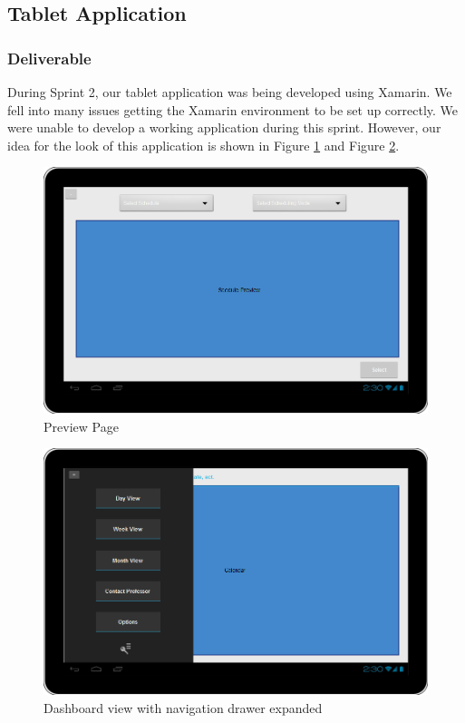 \subsection{Tablet Application}
\subsubsection{Deliverable}
During Sprint 2, our tablet application was being developed using Xamarin. We fell into many issues getting the Xamarin environment to be set up correctly. We were unable to develop a working application during this sprint.  However, our idea for the look of this application is shown in Figure \ref{fig:firstview} and Figure \ref{fig:navdrawer}. 

\begin{figure}
\centering
  \includegraphics[scale=0.45]{firstview.png}
  \caption{Preview Page}
  \label{fig:firstview}
\end{figure}

\begin{figure}
\centering
  \includegraphics[scale=0.45]{navigationdrawer.png}
  \caption{Dashboard view with navigation drawer expanded}
  \label{fig:navdrawer}
\end{figure}
